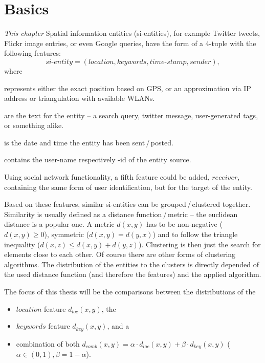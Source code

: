 \chapter{Basics}
\emph{%
This chapter
}
%
Spatial information entities (si-entities), for example Twitter tweets, Flickr image entries, or even Google queries, have the form of a 4-tuple with the following features: 
\begin{equation*}
si\text{-}entity = (location, keywords, time\text{-}stamp, sender),
\end{equation*}
where
\begin{description}\setlength{\itemsep}{-2mm}
\item[$location$] represents either the exact position based on GPS, or an approximation via IP address or triangulation with available WLANs.
\item[$keywords$] are the text for the entity -- a search query, twitter message, user-generated tags, or something alike.
\item[$time$-$stamp$] is the date and time the entity has been sent\,/\,posted.
\item[$sender$] contains the user-name respectively -id of the entity source.
\end{description}
Using social network functionality, a fifth feature could be added, $receiver$, containing the same form of user identification, but for the target of the entity.

Based on these features, similar si-entities can be grouped\,/\,clustered together. Similarity is usually defined as a distance function\,/\,metric -- the euclidean distance is a popular one. A metric $d(x,y)$ has to be non-negative ($d(x, y) \ge 0$), symmetric ($d(x, y) = d(y, x)$) and to follow the triangle inequality ($d(x, z) \le d(x, y) + d(y, z)$). Clustering is then just the search for elements close to each other. Of course there are other forms of clustering algorithms.
%
The distribution of the entities to the clusters is directly depended of the used distance function (and therefore the features) and the applied algorithm.

\bigskip
\noindent
The focus of this thesis will be the comparisons between the distributions of the
\begin{itemize}\setlength{\itemsep}{-2mm}
\item $location$ feature $d_{loc}(x,y)$, the 
\item $keywords$ feature $d_{key}(x,y)$, and a 
\item combination of both $d_{comb}(x,y) = \alpha \cdot d_{loc}(x,y) + \beta \cdot d_{key}(x,y)$ ($\alpha \in (0,1), \beta = 1-\alpha$).
\end{itemize}

